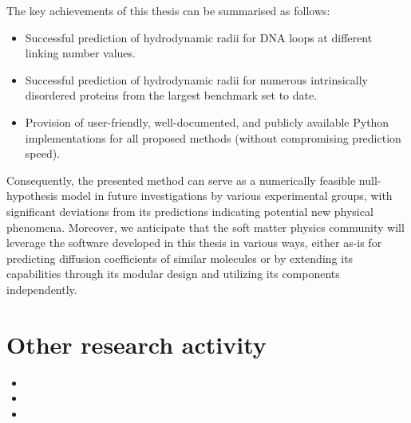 \documentclass{doctoral}
\begin{document}
The key achievements of this thesis can be summarised as follows:
\begin{itemize}
    \item Successful prediction of hydrodynamic radii for DNA loops at different linking number values.
    \item Successful prediction of hydrodynamic radii for numerous intrinsically disordered proteins from the largest benchmark set to date.
    \item Provision of user-friendly, well-documented, and publicly available Python implementations for all proposed methods (without compromising prediction speed).
\end{itemize}

Consequently, the presented method can serve as a numerically feasible null-hypothesis model in future investigations by various experimental groups, with significant deviations from its predictions indicating potential new physical phenomena.
Moreover, we anticipate that the soft matter physics community will leverage the software developed in this thesis in various ways, either as-is for predicting diffusion coefficients of similar molecules or by extending its capabilities through its modular design and utilizing its components independently.

\appendix

\chapter{Other research activity}
\begin{itemize}
    \item {}
    \item {}
    \item {}
\end{itemize}

\printbibliography[heading=bibchapter]
\end{document}
